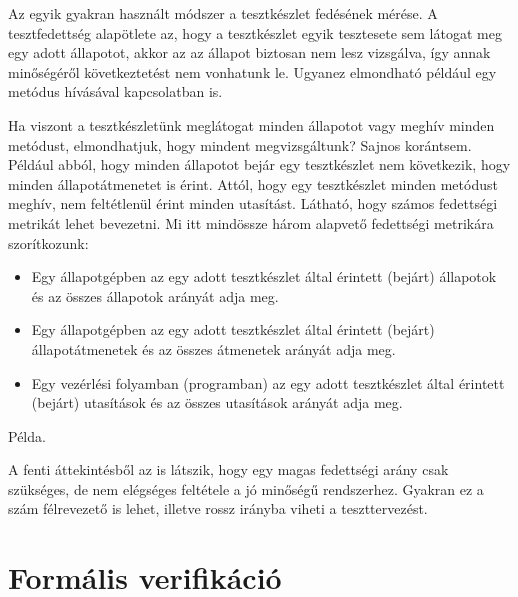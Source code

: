 Az egyik gyakran használt módszer a tesztkészlet fedésének mérése. A tesztfedettség alapötlete az, hogy a tesztkészlet egyik tesztesete sem látogat meg egy adott állapotot, akkor az az állapot biztosan nem lesz vizsgálva, így annak minőségéről következtetést nem vonhatunk le. Ugyanez elmondható például egy metódus hívásával kapcsolatban is.

Ha viszont a tesztkészletünk meglátogat minden állapotot vagy meghív minden metódust, elmondhatjuk, hogy mindent megvizsgáltunk? Sajnos korántsem. Például abból, hogy minden állapotot bejár egy tesztkészlet nem következik, hogy minden állapotátmenetet is érint. Attól, hogy egy tesztkészlet minden metódust meghív, nem feltétlenül érint minden utasítást. Látható, hogy számos fedettségi metrikát lehet bevezetni. Mi itt mindössze három alapvető fedettségi metrikára szorítkozunk:
\begin{itemize}
	\item Egy állapotgépben az  egy adott tesztkészlet által érintett (bejárt) állapotok és az összes állapotok arányát adja meg.
	\item Egy állapotgépben az  egy adott tesztkészlet által érintett (bejárt) állapotátmenetek és az összes átmenetek arányát adja meg.
	\item Egy vezérlési folyamban (programban) az  egy adott tesztkészlet által érintett (bejárt) utasítások és az összes utasítások arányát adja meg.	
\end{itemize}

\begin{megjegyzes}
Példa.
\end{megjegyzes}

A fenti áttekintésből az is látszik, hogy egy magas fedettségi arány csak szükséges, de nem elégséges feltétele a jó minőségű rendszerhez. Gyakran ez a szám félrevezető is lehet, illetve rossz irányba viheti a teszttervezést.


\section{Formális verifikáció}\label{sec:formalis-verifikacio}
